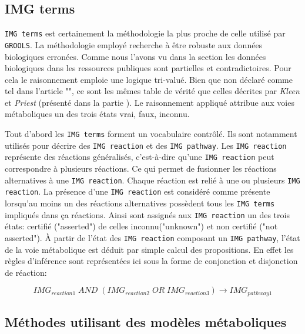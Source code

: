 \begin{refsegment}
    \subsection{IMG terms}
    
    \texttt{IMG terms} \cite{chen2013improving} est certainement la méthodologie la plus proche de celle utilisé par \texttt{\gls{GROOLS}}. La méthodologie employé recherche à être robuste aux données biologiques  erronées. Comme nous l'avons vu dans la section  les données biologiques dans les ressources publiques sont partielles et contradictoires. Pour cela le raisonnement emploie une logique tri-valué. Bien que non déclaré comme tel dans l'article "", ce sont les mêmes table de vérité que celles décrites par \textit{Kleen} et \textit{Priest} (présenté dans la partie ). Le raisonnement appliqué attribue aux voies métaboliques un des trois états vrai, faux, inconnu.
    
    Tout d'abord les \texttt{IMG terms} forment un vocabulaire contrôlé. Ils sont notamment utilisés pour décrire des \texttt{IMG reaction}  et des \texttt{IMG pathway}. Les \texttt{IMG reaction} représente des réactions généralisés, c'est-à-dire qu'une \texttt{IMG reaction} peut correspondre à plusieurs réactions. Ce qui permet de fusionner les réactions alternatives à une \texttt{IMG reaction}. Chaque réaction est relié à une ou plusieurs \texttt{IMG reaction}. La présence d'une \texttt{IMG reaction} est considéré comme présente lorsqu'au moins un des réactions alternatives possèdent tous les \texttt{IMG terms} impliqués dans ça réactions. Ainsi sont assignés aux \texttt{IMG reaction} un des trois états: certifié ("asserted") de celles inconnu("unknown") et non certifié ("not asserted"). À partir de l'état des \texttt{IMG reaction} composant un  \texttt{IMG pathway}, l'état de la voie métabolique est déduit par simple calcul des propositions. En effet les règles d'inférence sont représentées ici sous la forme de conjonction et disjonction de réaction:
    
    \begin{equation}
        IMG_{reaction1} \; AND \; (IMG_{reaction2} \; OR \; IMG_{reaction3} ) \to IMG_{pathway 1}
    \end{equation}
    
    \subsection{Méthodes utilisant des modèles métaboliques}
    

\end{refsegment}
